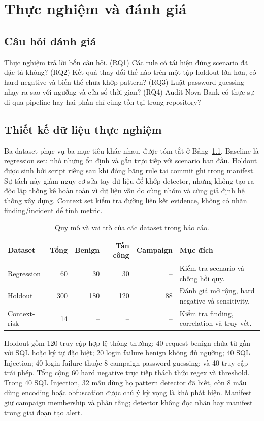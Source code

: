 \chapter{Thực nghiệm và đánh giá}
\label{chap:verification}

\section{Câu hỏi đánh giá}

Thực nghiệm trả lời bốn câu hỏi. (RQ1) Các rule có tái hiện đúng scenario đã
đặc tả không? (RQ2) Kết quả thay đổi thế nào trên một tập holdout lớn hơn, có
hard negative và biến thể chưa khớp pattern? (RQ3) Luật password guessing nhạy
ra sao với ngưỡng và cửa sổ thời gian? (RQ4) Audit Nova Bank có thực sự đi qua
pipeline hay hai phần chỉ cùng tồn tại trong repository?

\section{Thiết kế dữ liệu thực nghiệm}

Ba dataset phục vụ ba mục tiêu khác nhau, được tóm tắt ở
Bảng~\ref{tab:datasets}. Baseline là regression set: nhỏ nhưng ổn định và gắn
trực tiếp với scenario ban đầu. Holdout được sinh bởi script riêng sau khi đóng
băng rule tại commit ghi trong manifest. Sự tách này giảm nguy cơ sửa tay dữ
liệu để khớp detector, nhưng không tạo ra độc lập thống kê hoàn toàn vì dữ liệu
vẫn do cùng nhóm và cùng giả định hệ thống xây dựng. Context set kiểm tra đường
liên kết evidence, không có nhãn finding/incident để tính metric.

\begin{table}[htbp]
\centering
\small
\begin{tabularx}{\textwidth}{p{}rrrrX}
\toprule
Dataset & Tổng & Benign & Tấn công & Campaign & Mục đích \\
\midrule
Regression & 60 & 30 & 30 & -- & Kiểm tra scenario và chống hồi quy. \\
Holdout & 300 & 180 & 120 & 88 & Đánh giá mở rộng, hard negative và sensitivity. \\
Context-risk & 14 & -- & -- & -- & Kiểm tra finding, correlation và truy vết. \\
\bottomrule
\end{tabularx}
\caption{Quy mô và vai trò của các dataset trong báo cáo.}
\label{tab:datasets}
\end{table}

Holdout gồm 120 truy cập hợp lệ thông thường; 40 request benign chứa từ gần với
SQL hoặc ký tự đặc biệt; 20 login failure benign không đủ ngưỡng; 40 SQL
Injection; 40 login failure thuộc 8 campaign password guessing; và 40 truy cập
trái phép. Tổng cộng 60 hard negative trực tiếp thách thức regex và threshold.
Trong 40 SQL Injection, 32 mẫu dùng họ pattern detector đã biết, còn 8 mẫu dùng
encoding hoặc obfuscation được chủ ý kỳ vọng là khó phát hiện. Manifest giữ
campaign membership và phân tầng; detector không đọc nhãn hay manifest trong
giai đoạn tạo alert.

